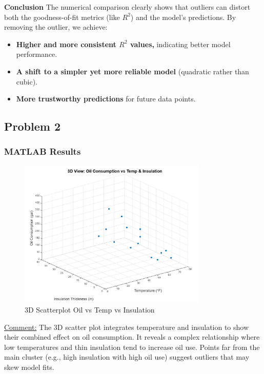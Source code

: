 \documentclass[12pt]{article}
\begin{document}
\textbf{Conclusion}
The numerical comparison clearly shows that outliers can distort both the goodness-of-fit metrics (like \( R^2 \)) and the model’s predictions. By removing the outlier, we achieve:

\begin{itemize}
    \item \textbf{Higher and more consistent \( R^2 \) values,} indicating better model performance.
    \item \textbf{A shift to a simpler yet more reliable model} (quadratic rather than cubic).
    \item \textbf{More trustworthy predictions} for future data points.
\end{itemize}
\subsection*{Problem 2}
\subsubsection*{MATLAB Results}
\begin{figure}[H]
    \centering
    \includegraphics[width=0.8\textwidth]{7.png}
    \caption{3D Scatterplot Oil vs Temp vs Insulation}
\end{figure}
\uline{Comment:} 
The 3D scatter plot integrates temperature and insulation to show their combined effect on oil consumption. It reveals a complex relationship where low temperatures and thin insulation tend to increase oil use. Points far from the main cluster (e.g., high insulation with high oil use) suggest outliers that may skew model fits.
\end{document}
